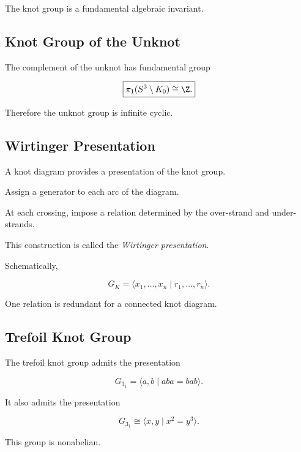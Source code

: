 The knot group is a fundamental algebraic invariant.

\subsection{Knot Group of the Unknot}
\label{subsec:unknot-group}

The complement of the unknot has fundamental group

\[
\boxed{
\pi_1(S^3\setminus K_0)
\cong
\Z.
}
\]

Therefore the unknot group is infinite cyclic.

\subsection{Wirtinger Presentation}
\label{subsec:wirtinger-presentation}

A knot diagram provides a presentation of the knot group.

Assign a generator to each arc of the diagram.

At each crossing, impose a relation determined by the over-strand and
under-strands.

This construction is called the \emph{Wirtinger presentation}.

Schematically,

\[
\boxed{
G_K
=
\langle
x_1,\ldots,x_n
\mid
r_1,\ldots,r_n
\rangle.
}
\]

One relation is redundant for a connected knot diagram.

\subsection{Trefoil Knot Group}
\label{subsec:trefoil-knot-group}

The trefoil knot group admits the presentation

\[
\boxed{
G_{3_1}
=
\langle
a,b
\mid
aba=bab
\rangle.
}
\]

It also admits the presentation

\[
\boxed{
G_{3_1}
\cong
\langle
x,y
\mid
x^2=y^3
\rangle.
}
\]

This group is nonabelian.

